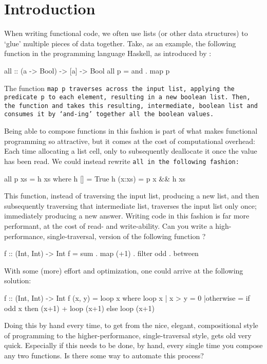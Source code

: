 \section{Introduction}
When writing functional code, we often use lists (or other data structures) to `glue' multiple pieces of data together.
Take, as an example, the following function in the programming language Haskell, as introduced by \cite{Gill1993}: %
\begin{code}
all :: (a -> Bool) -> [a] -> Bool
all p = and . map p
\end{code}
The function \tt{map p} traverses across the input list, applying the predicate \tt{p} to each element, resulting in a new boolean list.
Then, the function \tt{and} takes this resulting, intermediate, boolean list and consumes it by `and-ing' together all the boolean values.

Being able to compose functions in this fashion is part of what makes functional programming so attractive, but it comes at the cost of computational overhead:
Each time allocating a list cell, only to subsequently deallocate it once the value has been read.
We could instead rewrite \tt{all} in the following fashion:
\begin{code}
all p xs = h xs
  where h []     = True
        h (x:xs) = p x && h xs
\end{code}
This function, instead of traversing the input list, producing a new list, and then subsequently traversing that intermediate list, traverses the input list only once; immediately producing a new answer.
Writing code in this fashion is far more performant, at the cost of read- and write-ability.
Can you write a high-performance, single-traversal, version of the following function \citep{Harper2011}?
\begin{code}
f :: (Int, Int) -> Int
f = sum . map (+1) . filter odd . between
\end{code}
With some (more) effort and optimization, one could arrive at the following solution:
\begin{code}
f :: (Int, Int) -> Int
f (x, y) = loop x
  where loop x | x > y    = 0
               |otherwise = if odd x
                             then (x+1) + loop (x+1)
                             else loop (x+1)
\end{code}
Doing this by hand every time, to get from the nice, elegant, compositional style of programming to the higher-performance, single-traversal style, gets old very quick.
Especially if this needs to be done, by hand, every single time you compose any two functions.
Is there some way to automate this process?


